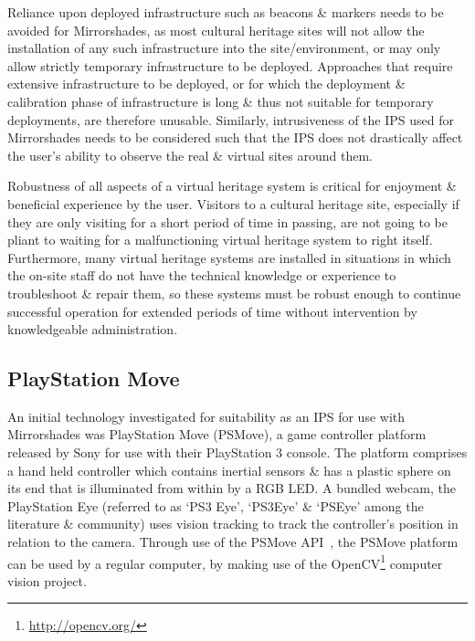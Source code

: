 Reliance upon deployed infrastructure such as beacons \& markers needs to be avoided for Mirrorshades, as most cultural heritage sites will not allow the installation of any such infrastructure into the site/environment, or may only allow strictly temporary infrastructure to be deployed. Approaches that require extensive infrastructure to be deployed, or for which the deployment \& calibration phase of infrastructure is long \& thus not suitable for temporary deployments, are therefore unusable. Similarly, intrusiveness of the IPS used for Mirrorshades needs to be considered such that the IPS does not drastically affect the user's ability to observe the real \& virtual sites around them.

Robustness of all aspects of a virtual heritage system is critical for enjoyment \& beneficial experience by the user. Visitors to a cultural heritage site, especially if they are only visiting for a short period of time in passing, are not going to be pliant to waiting for a malfunctioning virtual heritage system to right itself. Furthermore, many virtual heritage systems are installed in situations in which the on-site staff do not have the technical knowledge or experience to troubleshoot \& repair them, so these systems must be robust enough to continue successful operation for extended periods of time without intervention by knowledgeable administration.



\subsection{PlayStation Move}

An initial technology investigated for suitability as an IPS for use with Mirrorshades was PlayStation Move (PSMove), a game controller platform released by Sony for use with their PlayStation 3 console. The platform comprises a hand held controller which contains inertial sensors \& has a plastic sphere on its end that is illuminated from within by a RGB LED. A bundled webcam, the PlayStation Eye (referred to as `PS3 Eye', `PS3Eye' \& `PSEye' among the literature \& community) uses vision tracking to track the controller's position in relation to the camera. Through use of the PSMove API~\cite{Perl2012}, the PSMove platform can be used by a regular computer, by making use of the OpenCV\footnote{\url{http://opencv.org/}} computer vision project.

